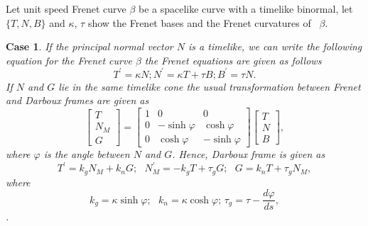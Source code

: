 \documentclass[reqno]{amsart}
\theoremstyle{plain}
\newtheorem{case}{Case}
\numberwithin{equation}{section}
\begin{document}
Let unit speed Frenet curve $\beta $ be a spacelike curve with a timelike
binormal, let $\{T,N,B\}$ and $\kappa $, $\tau $ show the Frenet bases and
the Frenet curvatures of \ $\beta .$

\begin{case}
If the principal normal vector $N$ is a timelike, we can write the following
equation for the Frenet curve $\beta $ the Frenet equations are given as
follows%
\begin{equation}
T^{\prime }=\kappa N;N^{\prime }=\kappa T+\tau B;B^{\prime }=\tau N. 
\tag{2.3}
\end{equation}%
If $N$ and $G$ lie in the same timelike cone the usual transformation
between Frenet and Darboux frames are given as%
\begin{equation}
\left[ 
\begin{array}{c}
T \\ 
N_{M} \\ 
G%
\end{array}%
\right] =\left[ 
\begin{array}{ccc}
1 & 0 & 0 \\ 
0 & -\sinh \varphi & \cosh \varphi \\ 
0 & \cosh \varphi & -\sinh \varphi%
\end{array}%
\right] \left[ 
\begin{array}{c}
T \\ 
N \\ 
B%
\end{array}%
\right] ,  \tag{2.4}
\end{equation}%
where $\varphi $ is the angle between $N$ and $G$. Hence, Darboux frame is
given as%
\begin{equation}
T^{\prime }=k_{g}N_{M}+k_{n}G;\text{ }N_{M}^{\prime }=-k_{g}T+\tau _{g}G;%
\text{ }G=k_{n}T+\tau _{g}N_{M},  \tag{2.5}
\end{equation}%
where 
\begin{equation}
k_{g}=\kappa \sinh \varphi ;\text{ }k_{n}=\kappa \cosh \varphi \text{; }\tau
_{g}=\tau -\frac{d\varphi }{ds},  \tag{2.6}
\end{equation}%
\cite{4,12}.
\end{case}
\end{document}
